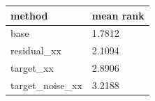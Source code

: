 \begin{tabular}{ll}
\toprule
method & mean rank \\
\midrule
base & 1.7812 \\
residual\_xx & 2.1094 \\
target\_xx & 2.8906 \\
target\_noise\_xx & 3.2188 \\
\bottomrule
\end{tabular}
